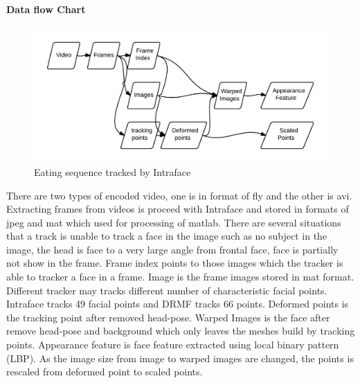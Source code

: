 \paragraph{Data flow Chart}
\begin{figure}[ht!]
\centering
\includegraphics[width=150mm]{imgs/DataFlowChart.png}
\caption{Eating sequence tracked by Intraface}
\end{figure}

There are two types of encoded video, one is in format of fly and the other is avi. Extracting frames from videos is proceed with Intraface and stored in formats of jpeg and mat which used for processing of matlab. There are several situations that a track is unable to track a face in the image such as no subject in the image, the head is face to a very large angle from frontal face, face is partially not show in the frame. Frame index points to those images which the tracker is able to tracker a face in a frame. Image is the frame images stored in mat format. Different tracker may tracks different number of characteristic facial points. Intraface tracks 49 facial points and DRMF tracks 66 points. Deformed points is the tracking point after removed head-pose. Warped Images is the face after remove head-pose and background which only leaves the meshes build by tracking points. Appearance feature is face feature extracted using local binary pattern (LBP). As the image size from image to warped images are changed, the points is rescaled from deformed point to scaled points.

